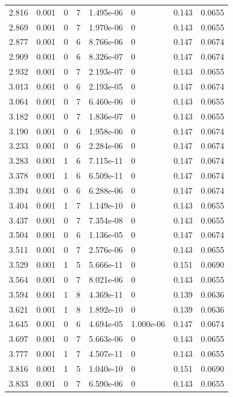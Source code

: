 \documentclass[preview]{standalone}
\begin{document}
{{{\begin{tabular}{L{1.2cm}C{1.2cm} C{0.3cm}C{0.5cm} C{1.4cm}C{1.4cm} C{1.4cm}C{1.4cm}}
  2.816  &  0.001  & 0     &  7 &  1.495e-06  & 0  & 0.143 &  0.0655   \\ 
  2.869  &  0.001  & 0     &  7 &  1.970e-06  & 0  & 0.143 &  0.0655   \\ 
  2.877  &  0.001  & 0     &  6 &  8.766e-06  & 0  & 0.147 &  0.0674   \\ 
  2.909  &  0.001  & 0     &  6 &  8.326e-07  & 0  & 0.147 &  0.0674   \\ 
  2.932  &  0.001  & 0     &  7 &  2.193e-07  & 0  & 0.143 &  0.0655   \\ 
  3.013  &  0.001  & 0     &  6 &  2.193e-05  & 0  & 0.147 &  0.0674   \\ 
  3.064  &  0.001  & 0     &  7 &  6.460e-06  & 0  & 0.143 &  0.0655   \\ 
  3.182  &  0.001  & 0     &  7 &  1.836e-07  & 0  & 0.143 &  0.0655   \\ 
  3.190  &  0.001  & 0     &  6 &  1.958e-06  & 0  & 0.147 &  0.0674   \\ 
  3.233  &  0.001  & 0     &  6 &  2.284e-06  & 0  & 0.147 &  0.0674   \\ 
  3.283  &  0.001  & 1     &  6 &  7.115e-11  & 0  & 0.147 &  0.0674   \\ 
  3.378  &  0.001  & 1     &  6 &  6.509e-11  & 0  & 0.147 &  0.0674   \\ 
  3.394  &  0.001  & 0     &  6 &  6.288e-06  & 0  & 0.147 &  0.0674   \\ 
  3.404  &  0.001  & 1     &  7 &  1.149e-10  & 0  & 0.143 &  0.0655   \\ 
  3.437  &  0.001  & 0     &  7 &  7.354e-08  & 0  & 0.143 &  0.0655   \\ 
  3.504  &  0.001  & 0     &  6 &  1.136e-05  & 0  & 0.147 &  0.0674   \\ 
  3.511  &  0.001  & 0     &  7 &  2.576e-06  & 0  & 0.143 &  0.0655   \\ 
  3.529  &  0.001  & 1     &  5 &  5.666e-11  & 0  & 0.151 &  0.0690   \\ 
  3.564  &  0.001  & 0     &  7 &  8.021e-06  & 0  & 0.143 &  0.0655   \\ 
  3.594  &  0.001  & 1     &  8 &  4.369e-11  & 0  & 0.139 &  0.0636   \\ 
  3.621  &  0.001  & 1     &  8 &  1.892e-10  & 0  & 0.139 &  0.0636   \\ 
  3.645  &  0.001  & 0     &  6 &  4.694e-05  & 1.000e-06  & 0.147 &  0.0674   \\ 
  3.697  &  0.001  & 0     &  7 &  5.663e-06  & 0  & 0.143 &  0.0655   \\ 
  3.777  &  0.001  & 1     &  7 &  4.507e-11  & 0  & 0.143 &  0.0655   \\ 
  3.816  &  0.001  & 1     &  5 &  1.040e-10  & 0  & 0.151 &  0.0690   \\ 
  3.833  &  0.001  & 0     &  7 &  6.590e-06  & 0  & 0.143 &  0.0655   \\ 
\hline 
\end{tabular} 

}}}
\end{document}
